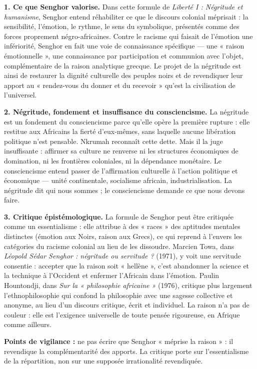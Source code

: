 \documentclass[11pt]{article}
\begin{document}
\begin{corrige}

\textbf{1. Ce que Senghor valorise.} Dans cette formule de \emph{Liberté I : Négritude et humanisme}, Senghor entend réhabiliter ce que le discours colonial méprisait : la sensibilité, l'émotion, le rythme, le sens du symbolique, présentés comme des forces proprement négro-africaines. Contre le racisme qui faisait de l'émotion une infériorité, Senghor en fait une voie de connaissance spécifique — une « raison émotionnelle », une connaissance par participation et communion avec l'objet, complémentaire de la raison analytique grecque. Le projet de la négritude est ainsi de restaurer la dignité culturelle des peuples noirs et de revendiquer leur apport au « rendez-vous du donner et du recevoir » qu'est la civilisation de l'universel.

\textbf{2. Négritude, fondement et insuffisance du consciencisme.} La négritude est un fondement du consciencisme parce qu'elle opère la première rupture : elle restitue aux Africains la fierté d'eux-mêmes, sans laquelle aucune libération politique n'est pensable. Nkrumah reconnaît cette dette. Mais il la juge insuffisante : affirmer sa culture ne renverse ni les structures économiques de domination, ni les frontières coloniales, ni la dépendance monétaire. Le consciencisme entend passer de l'affirmation culturelle à l'action politique et économique — unité continentale, socialisme africain, industrialisation. La négritude dit qui nous sommes ; le consciencisme demande ce que nous devons faire.

\textbf{3. Critique épistémologique.} La formule de Senghor peut être critiquée comme un essentialisme : elle attribue à des « races » des aptitudes mentales distinctes (émotion aux Noirs, raison aux Grecs), ce qui reprend à l'envers les catégories du racisme colonial au lieu de les dissoudre. Marcien Towa, dans \emph{Léopold Sédar Senghor : négritude ou servitude ?} (1971), y voit une servitude consentie : accepter que la raison soit « hellène », c'est abandonner la science et la technique à l'Occident et enfermer l'Africain dans l'émotion. Paulin Hountondji, dans \emph{Sur la « philosophie africaine »} (1976), critique plus largement l'ethnophilosophie qui confond la philosophie avec une sagesse collective et anonyme, au lieu d'un discours critique, écrit et individuel. La raison n'a pas de couleur : elle est l'exigence universelle de toute pensée rigoureuse, en Afrique comme ailleurs.

\textbf{Points de vigilance :} ne pas écrire que Senghor « méprise la raison » : il revendique la complémentarité des apports. La critique porte sur l'essentialisme de la répartition, non sur une supposée irrationalité revendiquée.
\end{corrige}
\end{document}
